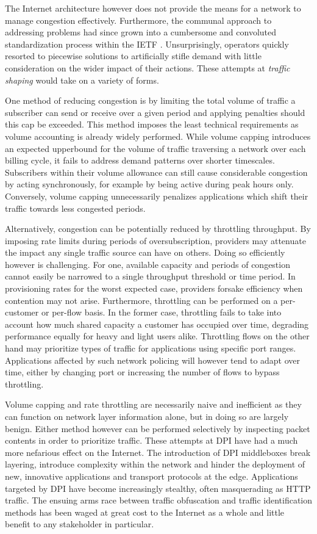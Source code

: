 The Internet architecture however does not provide the means for a network to manage congestion effectively.
Furthermore, the communal approach to addressing problems had since grown into a cumbersome and convoluted standardization process within the \ac{IETF} \cite{Bush:2005p476}.
Unsurprisingly, operators quickly resorted to piecewise solutions to artificially stifle demand with little consideration on the wider impact of their actions. These attempts at \emph{traffic shaping} would take on a variety of forms.

One method of reducing congestion is by limiting the total volume of traffic a subscriber can send or receive over a given period and applying penalties should this cap be exceeded.
This method imposes the least technical requirements as volume accounting is already widely performed.
While volume capping introduces an expected upperbound for the volume of traffic traversing a network over each billing cycle, it fails to address demand patterns over shorter timescales.
Subscribers within their volume allowance can still cause considerable congestion by acting synchronously, for example by being active during peak hours only. 
Conversely, volume capping unnecessarily penalizes applications which shift their traffic towards less congested periods. 

Alternatively, congestion can be potentially reduced by throttling throughput. 
By imposing rate limits during periods of oversubscription, providers may attenuate the impact any single traffic source can have on others.
Doing so efficiently however is challenging.
For one, available capacity and periods of congestion cannot easily be narrowed to a single throughput threshold or time period.
In provisioning rates for the worst expected case, providers forsake efficiency when contention may not arise.
Furthermore, throttling can be performed on a per-customer or per-flow basis.
In the former case, throttling fails to take into account how much shared capacity a customer has occupied over time, degrading performance equally for heavy and light users alike.
Throttling flows on the other hand may prioritize types of traffic for applications using specific port ranges. 
Applications affected by such network policing will however tend to adapt over time, either by changing port or increasing the number of flows to bypass throttling.

Volume capping and rate throttling are necessarily naive and inefficient as they can function on network layer information alone, but in doing so are largely benign.
Either method however can be performed selectively by inspecting packet contents in order to prioritize traffic.
These attempts at \ac{DPI} have had a much more nefarious effect on the Internet.
The introduction of \ac{DPI} middleboxes break layering, introduce complexity within the network and hinder the deployment of new, innovative applications and transport protocols at the edge.
Applications targeted by \ac{DPI} have become increasingly stealthy, often masquerading as \ac{HTTP} traffic.
The ensuing arms race between traffic obfuscation and traffic identification methods has been waged at great cost to the Internet as a whole and little benefit to any stakeholder in particular.

